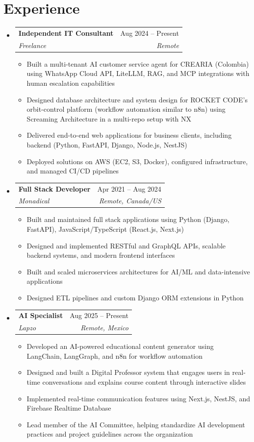 \documentclass[letterpaper,11pt]{article}
\makeatletter
\newcommand{\resumeSubheading}[4]{
  \vspace{-2pt}
  \item[]
  \begin{tabular*}{\textwidth}{@{\extracolsep{\fill}}l r}
    \textbf{#1} & #2 \\
    \textit{#3} & \textit{#4} \\
  \end{tabular*}
  \vspace{-5pt}
}
\makeatother
\begin{document}
\section{Experience}
\begin{itemize}[leftmargin=0pt, itemindent=0pt, label={}, itemsep=1pt]
\resumeSubheading
{Independent IT Consultant}{Aug 2024 -- Present}
{Freelance}{Remote}
\begin{itemize}[leftmargin=*, itemsep=0pt]
    \item Built a multi-tenant AI customer service agent for CREARIA (Colombia) using WhatsApp Cloud API, LiteLLM, RAG, and MCP integrations with human escalation capabilities
    \item Designed database architecture and system design for ROCKET CODE's orbit-control platform (workflow automation similar to n8n) using Screaming Architecture in a multi-repo setup with NX
    \item Delivered end-to-end web applications for business clients, including backend (Python, FastAPI, Django, Node.js, NestJS)
    \item Deployed solutions on AWS (EC2, S3, Docker), configured infrastructure, and managed CI/CD pipelines
\end{itemize}

\resumeSubheading
{Full Stack Developer}{Apr 2021 -- Aug 2024}
{Monadical}{Remote, Canada/US}
\begin{itemize}[leftmargin=*, itemsep=0pt]
    \item Built and maintained full stack applications using Python (Django, FastAPI), JavaScript/TypeScript (React.js, Next.js)
    \item Designed and implemented RESTful and GraphQL APIs, scalable backend systems, and modern frontend interfaces
    \item Built and scaled microservices architectures for AI/ML and data-intensive applications
    \item Designed ETL pipelines and custom Django ORM extensions in Python
\end{itemize}

\resumeSubheading
{AI Specialist}{Aug 2025 -- Present}
{Lapzo}{Remote, Mexico}
\begin{itemize}[leftmargin=*, itemsep=0pt]
    \item Developed an AI-powered educational content generator using LangChain, LangGraph, and n8n for workflow automation
    \item Designed and built a Digital Professor system that engages users in real-time conversations and explains course content through interactive slides
    \item Implemented real-time communication features using Next.js, NestJS, and Firebase Realtime Database
    \item Lead member of the AI Committee, helping standardize AI development practices and project guidelines across the organization
\end{itemize}


\end{itemize}
\end{document}

